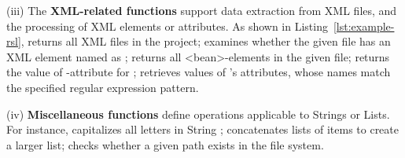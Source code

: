 (iii) The \textbf{XML-related functions} 
support data extraction from XML files, and the processing of XML elements or attributes.
 As shown in Listing~\ref{lst:example-rsl}, 
  returns all XML files in the project; 
  examines whether the given file has an XML element named as ; 
  returns all <bean>-elements in the given file;
  returns the value of -attribute for  ;
 retrieves values of 's attributes, whose names match the specified regular expression pattern. 


(iv) \textbf{Miscellaneous functions} define  operations applicable to Strings or Lists. For instance,  capitalizes all letters in String ;  
 concatenates lists of items to create a larger list; 
 checks whether a given path exists in the file system. 
